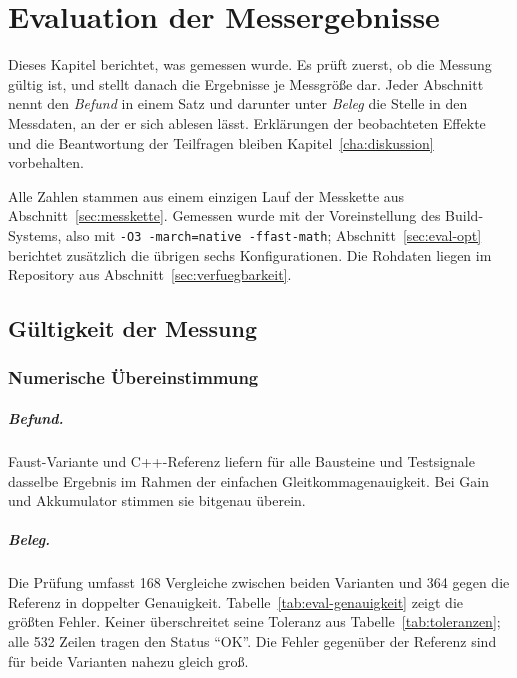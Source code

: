 \chapter{Evaluation der Messergebnisse}
\label{cha:evaluation}

Dieses Kapitel berichtet, was gemessen wurde. Es prüft zuerst, ob die Messung gültig ist, und stellt danach die Ergebnisse je Messgröße dar. Jeder Abschnitt nennt den \emph{Befund} in einem Satz und darunter unter \emph{Beleg} die Stelle in den Messdaten, an der er sich ablesen lässt. Erklärungen der beobachteten Effekte und die Beantwortung der Teilfragen bleiben Kapitel~\ref{cha:diskussion} vorbehalten.

Alle Zahlen stammen aus einem einzigen Lauf der Messkette aus Abschnitt~\ref{sec:messkette}. Gemessen wurde mit der Voreinstellung des Build-Systems, also mit \texttt{-O3 -march=native -ffast-math}; Abschnitt~\ref{sec:eval-opt} berichtet zusätzlich die übrigen sechs Konfigurationen. Die Rohdaten liegen im Repository aus Abschnitt~\ref{sec:verfuegbarkeit}.

\section{Gültigkeit der Messung}
\label{sec:eval-gueltigkeit}

\subsection{Numerische Übereinstimmung}

\paragraph{Befund.}
Faust-Variante und C++-Referenz liefern für alle Bausteine und Testsignale dasselbe Ergebnis im Rahmen der einfachen Gleitkommagenauigkeit. Bei Gain und Akkumulator stimmen sie bitgenau überein.

\paragraph{Beleg.}
Die Prüfung umfasst 168 Vergleiche zwischen beiden Varianten und 364 gegen die Referenz in doppelter Genauigkeit. Tabelle~\ref{tab:eval-genauigkeit} zeigt die größten Fehler. Keiner überschreitet seine Toleranz aus Tabelle~\ref{tab:toleranzen}; alle 532 Zeilen tragen den Status \enquote{OK}. Die Fehler gegenüber der Referenz sind für beide Varianten nahezu gleich groß.

